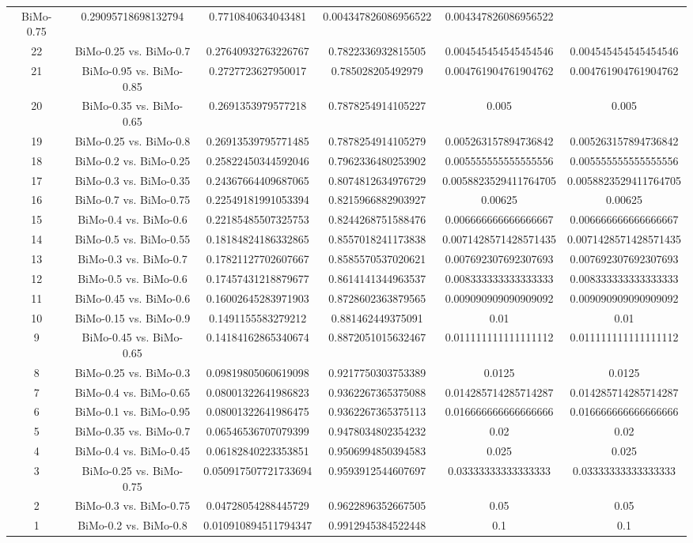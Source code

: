 \documentclass[a4paper,10pt]{article}
\begin{document}
\begin{landscape}
\begin{table}[!htp]
\begin{tabular}{cccccc}
BiMo-0.75&0.29095718698132794&0.7710840634043481&0.004347826086956522&0.004347826086956522\\22&BiMo-0.25 vs. BiMo-0.7&0.27640932763226767&0.7822336932815505&0.004545454545454546&0.004545454545454546\\21&BiMo-0.95 vs. BiMo-0.85&0.2727723627950017&0.785028205492979&0.004761904761904762&0.004761904761904762\\20&BiMo-0.35 vs. BiMo-0.65&0.2691353979577218&0.7878254914105227&0.005&0.005\\19&BiMo-0.25 vs. BiMo-0.8&0.26913539795771485&0.7878254914105279&0.005263157894736842&0.005263157894736842\\18&BiMo-0.2 vs. BiMo-0.25&0.25822450344592046&0.7962336480253902&0.005555555555555556&0.005555555555555556\\17&BiMo-0.3 vs. BiMo-0.35&0.24367664409687065&0.8074812634976729&0.0058823529411764705&0.0058823529411764705\\16&BiMo-0.7 vs. BiMo-0.75&0.22549181991053394&0.8215966882903927&0.00625&0.00625\\15&BiMo-0.4 vs. BiMo-0.6&0.22185485507325753&0.8244268751588476&0.006666666666666667&0.006666666666666667\\14&BiMo-0.5 vs. BiMo-0.55&0.18184824186332865&0.8557018241173838&0.0071428571428571435&0.0071428571428571435\\13&BiMo-0.3 vs. BiMo-0.7&0.17821127702607667&0.8585570537020621&0.007692307692307693&0.007692307692307693\\12&BiMo-0.5 vs. BiMo-0.6&0.17457431218879677&0.8614141344963537&0.008333333333333333&0.008333333333333333\\11&BiMo-0.45 vs. BiMo-0.6&0.16002645283971903&0.8728602363879565&0.009090909090909092&0.009090909090909092\\10&BiMo-0.15 vs. BiMo-0.9&0.1491155583279212&0.881462449375091&0.01&0.01\\9&BiMo-0.45 vs. BiMo-0.65&0.14184162865340674&0.8872051015632467&0.011111111111111112&0.011111111111111112\\8&BiMo-0.25 vs. BiMo-0.3&0.09819805060619098&0.9217750303753389&0.0125&0.0125\\7&BiMo-0.4 vs. BiMo-0.65&0.08001322641986823&0.9362267365375088&0.014285714285714287&0.014285714285714287\\6&BiMo-0.1 vs. BiMo-0.95&0.08001322641986475&0.9362267365375113&0.016666666666666666&0.016666666666666666\\5&BiMo-0.35 vs. BiMo-0.7&0.06546536707079399&0.9478034802354232&0.02&0.02\\4&BiMo-0.4 vs. BiMo-0.45&0.06182840223353851&0.9506994850394583&0.025&0.025\\3&BiMo-0.25 vs. BiMo-0.75&0.050917507721733694&0.9593912544607697&0.03333333333333333&0.03333333333333333\\2&BiMo-0.3 vs. BiMo-0.75&0.04728054288445729&0.9622896352667505&0.05&0.05\\1&BiMo-0.2 vs. BiMo-0.8&0.010910894511794347&0.9912945384522448&0.1&0.1\\\hline

\end{tabular}
\end{table}
\end{landscape}
\end{document}
